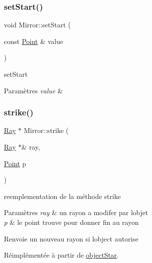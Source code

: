 \subsubsection{\texorpdfstring{setStart()}{setStart()}}
{\footnotesize\ttfamily void Mirror\+::set\+Start (\begin{DoxyParamCaption}\item[{const \mbox{\hyperlink{class_point}{Point}} \&}]{value }\end{DoxyParamCaption})}



set\+Start 


\begin{DoxyParams}{Paramètres}
{\em value} & \\
\hline
\end{DoxyParams}
\mbox{\label{class_mirror_aa943dbc39297e6c9ca0935ec25ecb96e}} 
\subsubsection{\texorpdfstring{strike()}{strike()}}
{\footnotesize\ttfamily \mbox{\hyperlink{class_ray}{Ray}} $\ast$ Mirror\+::strike (\begin{DoxyParamCaption}\item[{\mbox{\hyperlink{class_ray}{Ray}} $\ast$\&}]{ray,  }\item[{\mbox{\hyperlink{class_point}{Point}}}]{p }\end{DoxyParamCaption})\hspace{0.3cm}{\ttfamily [virtual]}}

reemplementation de la méthode strike 
\begin{DoxyParams}{Paramètres}
{\em ray} & un rayon a modifer par l\textquotesingle{}objet \\
\hline
{\em p} & le point trouve pour donner fin au rayon \\
\hline
\end{DoxyParams}
\begin{DoxyReturn}{Renvoie}
un nouveau rayon si l\textquotesingle{}object autorise 
\end{DoxyReturn}


Réimplémentée à partir de \mbox{\hyperlink{classobject_star_a5155713af07f8397057706a1eeb843ed}{object\+Star}}.

\mbox{\label{class_mirror_abac1f72763c81fae43b6524c23577c77}} 
